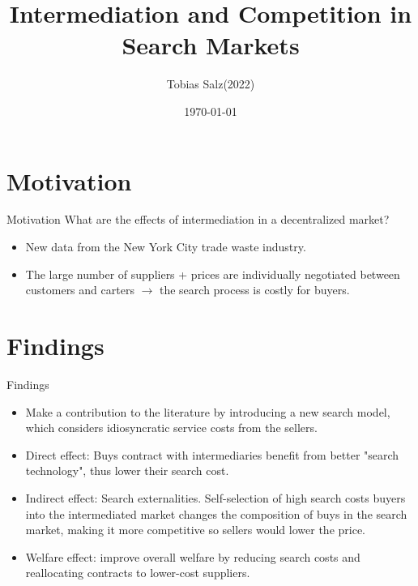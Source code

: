 \documentclass[dvipsnames,mathserif]{beamer}
\begin{document}
\rightskip\rightmargin
\title{Intermediation and Competition in Search Markets}
\author{Tobias Salz(2022)}


\footnotesize{\date{\today }


\begin{frame}
\maketitle
\end{frame}


%
\footnotesize \tableofcontents
%
\section{Motivation}
\begin{frame}{Motivation}
What are the effects of intermediation in a decentralized market?
    \begin{itemize}
    \item New data from the New York City trade waste industry.
    \item The large number of suppliers + prices are individually negotiated between customers and carters $\rightarrow$ the search process is costly for buyers.
    \end{itemize}  
\end{frame}


\section{Findings}
\begin{frame}{Findings}
    \begin{itemize}
        \item Make a contribution to the literature by introducing a new search model, which considers idiosyncratic service costs from the sellers.
        \item Direct effect: Buys contract with intermediaries benefit from better "search technology", thus lower their search cost. 
        \item Indirect effect: Search externalities. Self-selection of high search costs buyers into the intermediated market changes the composition of buys in the search market, making it more competitive so sellers would lower the price.
        \item Welfare effect: improve overall welfare by reducing search costs and reallocating contracts to lower-cost suppliers.
    \end{itemize}
\end{frame}
}
\end{document}
